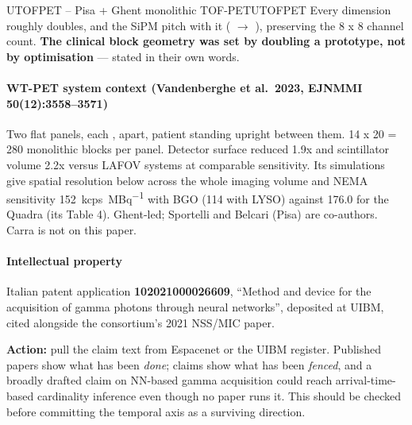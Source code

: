 \begin{programnote}{UTOFPET -- Pisa + Ghent monolithic TOF-PET}{UTOFPET}
Every dimension roughly doubles, and the SiPM pitch with it (
$\rightarrow$ ), preserving the 8 x 8 channel count. \textbf{The clinical
block geometry was set by doubling a prototype, not by optimisation} --- stated
in their own words. 

\paragraph{WT-PET system context (Vandenberghe et al.\ 2023, EJNMMI 50(12):3558--3571)}
Two flat panels, each ,  apart, patient
standing upright between them. 14 x 20 = 280 monolithic blocks per panel.
Detector surface reduced 1.9x and scintillator volume 2.2x versus LAFOV systems
at comparable sensitivity. Its simulations give spatial resolution below
 across the whole imaging volume and NEMA sensitivity
\qty{152}{kcps\per\mega\becquerel} with BGO (114 with LYSO) against 176.0 for
the Quadra (its Table 4). Ghent-led;
Sportelli and Belcari (Pisa) are co-authors. Carra is not on this paper.


\paragraph{Intellectual property}
Italian patent application \textbf{102021000026609}, ``Method and device for the
acquisition of gamma photons through neural networks'', deposited at UIBM,
cited alongside the consortium's 2021 NSS/MIC paper.

\textbf{Action:} pull the claim text from Espacenet or the UIBM register.
Published papers show what has been \emph{done}; claims show what has been
\emph{fenced}, and a broadly drafted claim on NN-based gamma acquisition could
reach arrival-time-based cardinality inference even though no paper runs it.
This should be checked before committing the temporal axis as a surviving
direction.


\end{programnote}
